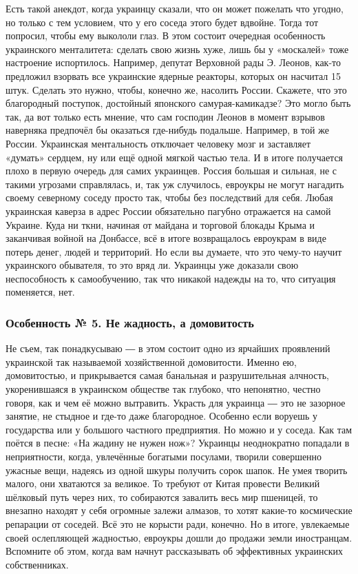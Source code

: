 Есть такой анекдот, когда украинцу сказали, что он может пожелать что угодно,
но только с тем условием, что у его соседа этого будет вдвойне. Тогда тот
попросил, чтобы ему выкололи глаз. В этом состоит очередная особенность
украинского менталитета: сделать свою жизнь хуже, лишь бы у «москалей» тоже
настроение испортилось. Например, депутат Верховной рады Э. Леонов, как-то
предложил взорвать все украинские ядерные реакторы, которых он насчитал 15
штук. Сделать это нужно, чтобы, конечно же, насолить России. Скажете, что это
благородный поступок, достойный японского самурая-камикадзе? Это могло быть
так, да вот только есть мнение, что сам господин Леонов в момент взрывов
наверняка предпочёл бы оказаться где-нибудь подальше. Например, в той же
России. Украинская ментальность отключает человеку мозг и заставляет «думать»
сердцем, ну или ещё одной мягкой частью тела. И в итоге получается плохо в
первую очередь для самих украинцев. Россия большая и сильная, не с такими
угрозами справлялась, и, так уж случилось, евроукры не могут нагадить своему
северному соседу просто так, чтобы без последствий для себя. Любая украинская
каверза в адрес России обязательно пагубно отражается на самой Украине. Куда ни
ткни, начиная от майдана и торговой блокады Крыма и заканчивая войной на
Донбассе, всё в итоге возвращалось евроукрам в виде потерь денег, людей и
территорий. Но если вы думаете, что это чему-то научит украинского обывателя,
то это вряд ли. Украинцы уже доказали свою неспособность к самообучению, так
что никакой надежды на то, что ситуация поменяется, нет.

\subsubsection{Особенность № 5. Не жадность, а домовитость}

Не съем, так понадкусываю ― в этом состоит одно из ярчайших проявлений
украинской так называемой хозяйственной домовитости. Именно ею, домовитостью, и
прикрывается самая банальная и разрушительная алчность, укоренившаяся в
украинском обществе так глубоко, что непонятно, честно говоря, как и чем её
можно вытравить. Украсть для украинца ― это не зазорное занятие, не стыдное и
где-то даже благородное. Особенно если воруешь у государства или у большого
частного предприятия. Но можно и у соседа. Как там поётся в песне: «На жадину
не нужен нож»? Украинцы неоднократно попадали в неприятности, когда, увлечённые
богатыми посулами, творили совершенно ужасные вещи, надеясь из одной шкуры
получить сорок шапок. Не умея творить малого, они хватаются за великое. То
требуют от Китая провести Великий шёлковый путь через них, то собираются
завалить весь мир пшеницей, то внезапно находят у себя огромные залежи алмазов,
то хотят какие-то космические репарации от соседей. Всё это не корысти ради,
конечно. Но в итоге, увлекаемые своей ослепляющей жадностью, евроукры дошли до
продажи земли иностранцам. Вспомните об этом, когда вам начнут рассказывать об
эффективных украинских собственниках.

